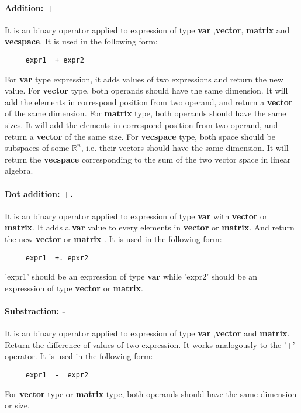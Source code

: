 \documentclass[12pt]{article} %
\begin{document}
\paragraph{Addition: + }
It is an binary operator applied to expression of type \textbf{var} ,\textbf{vector}, \textbf{matrix} and \textbf{vecspace}.  It is used in the following form:
\begin{lstlisting}
     expr1  + expr2
\end{lstlisting}
For \textbf{var} type expression, it adds values of two expressions and return the new value. For \textbf{vector}  type,  both operands should have the same dimension.
  It will add the elements in correspond position from two  operand, and return a \textbf{vector} of the same dimension. For \textbf{matrix} type, both operands should have the same sizes. 
It will add the elements in correspond position from two  operand, and return a \textbf{vector} of the same  size. For \textbf{vecspace} type, both space should be subspaces of some $\mathbb{R}^n$, i.e. their vectors should have the same dimension. It will return the \textbf{vecspace} corresponding to the sum of the two vector space in linear algebra.
 
\paragraph{ Dot addition: +.  }
It is an binary operator applied to expression of type  \textbf{var} with \textbf{vector} or \textbf{matrix}. It adds a \textbf{var} value to every elements in \textbf{vector}  or  \textbf{matrix}. And return the new \textbf{vector} or  \textbf{matrix} . It is used in the following form: 
\begin{lstlisting}
     expr1  +. epxr2
\end{lstlisting}
'expr1' should be an expression of type  \textbf{var} while 'expr2' should be an expresssion of type  \textbf{vector} or  \textbf{matrix}.

\paragraph{Substraction: - }
It is an binary operator applied to expression of type \textbf{var} ,\textbf{vector} and  \textbf{matrix}. Return the difference of values of two expression. It works analogously to the '+' operator. It is used in the following form:
\begin{lstlisting}
     expr1  -  expr2
\end{lstlisting}
 For \textbf{vector}  type or \textbf{matrix} type,  both operands should have the same dimension or size.
  
\end{document}
